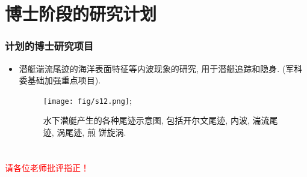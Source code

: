 \documentclass[UTF8]{ctexbeamer}	%
\theoremstyle{plain}
\theoremstyle{definition}
\theoremstyle{remark}
\numberwithin{equation}{section}
\begin{document}
\section{博士阶段的研究计划}
\begin{frame}
    \frametitle{计划的博士研究项目}
    \begin{itemize}
        \item 潜艇湍流尾迹的海洋表面特征等内波现象的研究, 用于潜艇追踪和隐身.
        (军科委基础加强重点项目).
        \begin{figure}
            \texttt{[image: fig/s12.png]};
            \caption{水下潜艇产生的各种尾迹示意图, 包括开尔文尾迹, 内波, 湍流尾迹, 涡尾迹, 煎
            饼旋涡.}
        \end{figure}
    \end{itemize}
\end{frame}

\section*{}
\begin{frame}
    \centering\huge
    \textcolor{red}{请各位老师批评指正！}
\end{frame}
\end{document}
